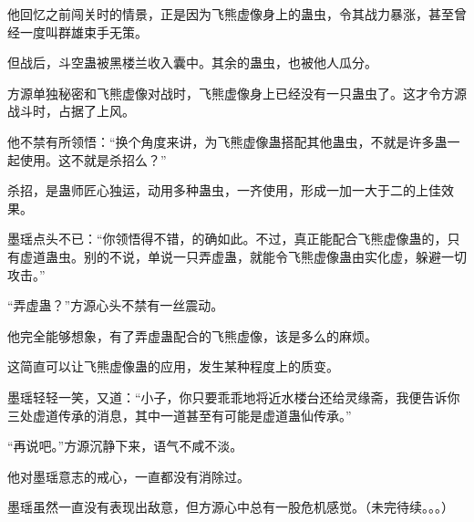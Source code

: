 \begin{this_body}
他回忆之前闯关时的情景，正是因为飞熊虚像身上的蛊虫，令其战力暴涨，甚至曾经一度叫群雄束手无策。

但战后，斗空蛊被黑楼兰收入囊中。其余的蛊虫，也被他人瓜分。

方源单独秘密和飞熊虚像对战时，飞熊虚像身上已经没有一只蛊虫了。这才令方源战斗时，占据了上风。

他不禁有所领悟：“换个角度来讲，为飞熊虚像蛊搭配其他蛊虫，不就是许多蛊一起使用。这不就是杀招么？”

杀招，是蛊师匠心独运，动用多种蛊虫，一齐使用，形成一加一大于二的上佳效果。

墨瑶点头不已：“你领悟得不错，的确如此。不过，真正能配合飞熊虚像蛊的，只有虚道蛊虫。别的不说，单说一只弄虚蛊，就能令飞熊虚像蛊由实化虚，躲避一切攻击。”

“弄虚蛊？”方源心头不禁有一丝震动。

他完全能够想象，有了弄虚蛊配合的飞熊虚像，该是多么的麻烦。

这简直可以让飞熊虚像蛊的应用，发生某种程度上的质变。

墨瑶轻轻一笑，又道：“小子，你只要乖乖地将近水楼台还给灵缘斋，我便告诉你三处虚道传承的消息，其中一道甚至有可能是虚道蛊仙传承。”

“再说吧。”方源沉静下来，语气不咸不淡。

他对墨瑶意志的戒心，一直都没有消除过。

墨瑶虽然一直没有表现出敌意，但方源心中总有一股危机感觉。（未完待续。。。）

\end{this_body}

